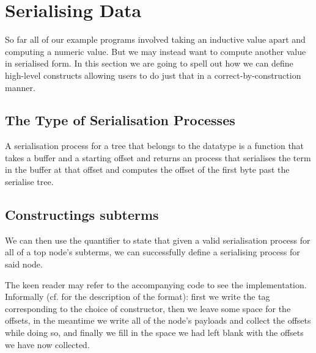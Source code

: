 \section{Serialising Data}\label{sec:serialising}

So far all of our example programs involved taking an inductive value
apart and computing a numeric value.
%
But we may instead want to compute another value in serialised form.
%
In this section we are going to spell out how we can define high-level
constructs allowing users to do just that in a correct-by-construction
manner.





\subsection{The Type of Serialisation Processes}

A serialisation process for a tree  that belongs to the
datatype  is a function that takes a buffer
and a starting offset and returns an  process that
serialises the term in the buffer at that offset and computes the
offset of the first byte past the serialise tree.



\subsection{Constructings subterms}


We can then use the  quantifier to state that given a
valid serialisation process for all of a top node's subterms, we can
successfully define a serialising process for said node.


The keen reader may refer to the accompanying code to see the implementation.
Informally (cf.  for the description of the format):
first we write the tag corresponding to the choice of constructor,
then we leave some space for the offsets,
in the meantime we write all of the node's payloads and collect the offsets while doing so,
and finally we fill in the space we had left blank with the offsets we have now collected.

